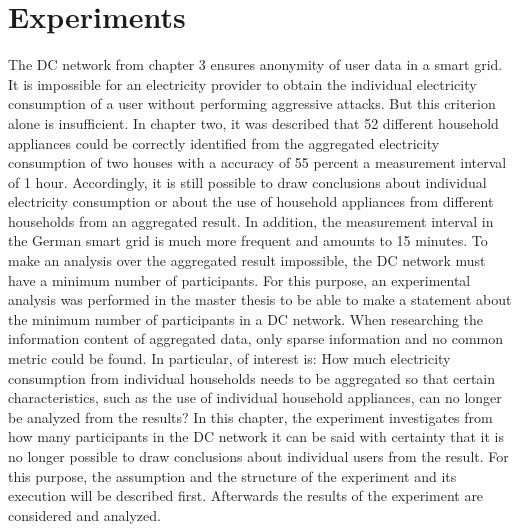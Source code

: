 \chapter{Experiments}
\label{sec:evaluation}



The DC network from chapter 3 ensures anonymity of user data in a smart grid. It is impossible for an electricity provider to obtain the individual electricity consumption of a user without performing aggressive attacks. But this criterion alone is insufficient. In chapter two, it was described that 52 different household appliances could be correctly identified from the aggregated electricity consumption of two houses with a accuracy of 55 percent a measurement interval of 1 hour. Accordingly, it is still possible to draw conclusions about individual electricity consumption or about the use of household appliances from different households from an aggregated result. In addition, the measurement interval in the German smart grid is much more frequent and amounts to 15 minutes. To make an analysis over the aggregated result impossible, the DC network must have a minimum number of participants. For this purpose, an experimental analysis was performed in the master thesis to be able to make a statement about the minimum number of participants in a DC network. When researching the information content of aggregated data, only sparse information and no common metric could be found. In particular, of interest is: How much electricity consumption from individual households needs to be aggregated so that certain characteristics, such as the use of individual household appliances, can no longer be analyzed from the results? In this chapter, the experiment investigates from how many participants in the DC network it can be said with certainty that it is no longer possible to draw conclusions about individual users from the result. For this purpose, the assumption and the structure of the experiment and its execution will be described first. Afterwards the results of the experiment are considered and analyzed.
